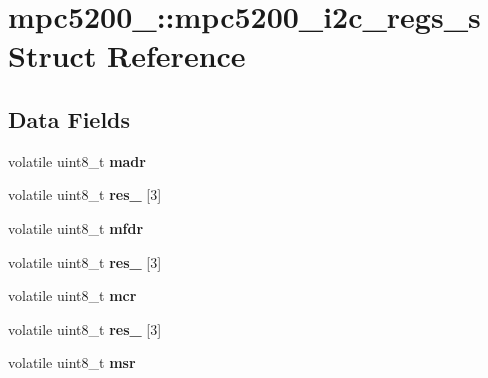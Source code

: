 \hypertarget{structmpc5200___1_1mpc5200__i2c__regs__s}{}\section{mpc5200\+\_\+\+::mpc5200\+\_\+i2c\+\_\+regs\+\_\+s Struct Reference}
\label{structmpc5200___1_1mpc5200__i2c__regs__s}
\subsection*{Data Fields}
\begin{DoxyCompactItemize}
\item 
\mbox{\label{structmpc5200___1_1mpc5200__i2c__regs__s_a4e964d9d115d52cb57d4eb9bc7b8d80c}} 
volatile uint8\+\_\+t {\bfseries madr}
\item 
\mbox{\label{structmpc5200___1_1mpc5200__i2c__regs__s_a44eb367a57ac05484f8c5571f68cd0c6}} 
volatile uint8\+\_\+t {\bfseries res\+\_} \mbox{[}3\mbox{]}
\item 
\mbox{\label{structmpc5200___1_1mpc5200__i2c__regs__s_a49a97b9ef21fab8a2e13198cc49a469e}} 
volatile uint8\+\_\+t {\bfseries mfdr}
\item 
\mbox{\label{structmpc5200___1_1mpc5200__i2c__regs__s_a6480b865c8f7fdf3ba99d32d12aa33f9}} 
volatile uint8\+\_\+t {\bfseries res\+\_} \mbox{[}3\mbox{]}
\item 
\mbox{\label{structmpc5200___1_1mpc5200__i2c__regs__s_aa69c8037f9f93d5344dbb80b427c7649}} 
volatile uint8\+\_\+t {\bfseries mcr}
\item 
\mbox{\label{structmpc5200___1_1mpc5200__i2c__regs__s_abbabca39f6eb69fc94be1bac29a19246}} 
volatile uint8\+\_\+t {\bfseries res\+\_} \mbox{[}3\mbox{]}
\item 
\mbox{\label{structmpc5200___1_1mpc5200__i2c__regs__s_a39d2fa741e6b73b35d0b2fcee43a55fc}} 
volatile uint8\+\_\+t {\bfseries msr}
\item 

\end{DoxyCompactItemize}
